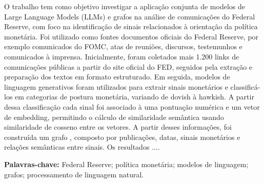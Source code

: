\begin{center}
  {\bfseries \sffamily \fontsize{11}{11} }
\end{center}


\vspace{0.5cm}

O trabalho tem como objetivo investigar a aplicação conjunta 
de modelos de Large Language Models (LLMs) e grafos na 
análise de comunicações do Federal Reserve, com foco na identificação 
de sinais relacionados à orientação da política monetária. Foi utilizado 
como fontes documentos oficiais do Federal Reserve, por exemplo comunicados 
do FOMC, atas de reuniões, discursos, testemunhos e comunicados à imprensa. 
Inicialmente, foram coletados mais 1.200 links de comunicações públicas a partir 
do site oficial do FED, seguidos pela extração e preparação dos textos 
em formato estruturado. Em seguida, modelos de linguagem generativos foram 
utilizados para extrair sinais monetários e 
classificá-los em categorias de postura monetária, 
variando de dovish à hawkish. A partir dessa classificação cada 
sinal foi associado à uma pontuação numérica e um vetor de embedding, 
permitindo o cálculo de similaridade semântica usando similaridade
de cosseno entre os vetores. A partir desses informações, foi construída 
um grafo , composto por publicações, datas, sinais 
monetários e relações semânticas entre sinais. Os resultados ....


\vspace{1cm}
\noindent\textbf{Palavras-chave:} 
Federal Reserve; política monetária; modelos de linguagem; 
grafos; processamento de linguagem natural.
